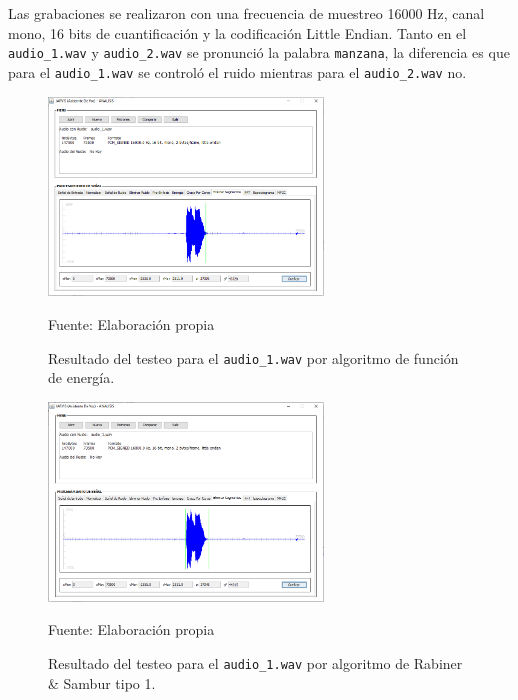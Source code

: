 Las grabaciones se realizaron con una frecuencia de muestreo 16000 Hz, canal mono, 16 bits de cuantificación y la codificación Little Endian. Tanto en el \texttt{audio\_1.wav} y \texttt{audio\_2.wav} se pronunció la palabra \texttt{manzana}, la diferencia es que para el \texttt{audio\_1.wav} se controló el ruido mientras para el \texttt{audio\_2.wav} no.

\begin{figure}[H]
\begin{center}
\includegraphics[width=0.65\textwidth]{Imagenes/Cap3/image071}
\end{center}
\begin{center}
\vskip -0.5cm
\caption{\small{Resultado del testeo para el \texttt{audio\_1.wav} por algoritmo de función de energía.}}
\label{fig:figura3.71}
{\small{Fuente: Elaboración propia}}
\end{center}
\end{figure}

\vskip -1cm

\begin{figure}[H]
\begin{center}
\includegraphics[width=0.65\textwidth]{Imagenes/Cap3/image072}
\end{center}
\begin{center}
\vskip -0.5cm
\caption{\small{Resultado del testeo para el \texttt{audio\_1.wav} por algoritmo de Rabiner \& Sambur tipo 1.}}
\label{fig:figura3.72}
{\small{Fuente: Elaboración propia}}
\end{center}
\end{figure}

